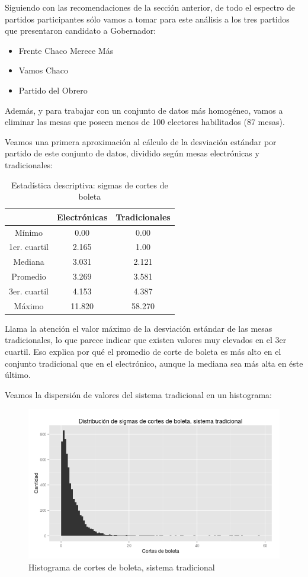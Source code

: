 \documentclass[12pt,a4paper]{article}
\begin{document}
Siguiendo con las recomendaciones de la sección anterior, de todo el espectro de
partidos participantes sólo vamos a tomar para este análisis a los tres partidos
que presentaron candidato a Gobernador:

\begin{itemize}
  \item Frente Chaco Merece Más
  \item Vamos Chaco
  \item Partido del Obrero
\end{itemize}

Además, y para trabajar con un conjunto de datos más homogéneo, vamos a eliminar
las mesas que poseen menos de 100 electores habilitados (87 mesas).

Veamos una primera aproximación al cálculo de la desviación estándar por partido
de este conjunto de datos, dividido según mesas electrónicas y tradicionales:

\begin{table}[h!]
\centering
\label{my-label}
\begin{tabular}{c c c}
 & Electrónicas & Tradicionales \\
\hline
Mínimo & 0.00 & 0.00 \\
1er. cuartil & 2.165 & 1.00 \\
Mediana & 3.031 & 2.121 \\
Promedio & 3.269 & 3.581 \\
3er. cuartil & 4.153 & 4.387 \\
Máximo & 11.820 & 58.270 \\
\hline
\end{tabular}
\caption{Estadística descriptiva: sigmas de cortes de boleta}
\label{table:1}
\end{table}

Llama la atención el valor máximo de la desviación estándar de las mesas
tradicionales, lo que parece indicar que existen valores muy elevados en el 3er
cuartil. Eso explica por qué el promedio de corte de boleta es más alto en el
conjunto tradicional que en el electrónico, aunque la mediana sea más alta en
éste último.

Veamos la dispersión de valores del sistema tradicional en un histograma:

\begin{figure}[h]
\centering
    \includegraphics[width=\textwidth]{sigmas_tradicional}
\caption{Histograma de cortes de boleta, sistema tradicional}
\end{figure}
\end{document}

